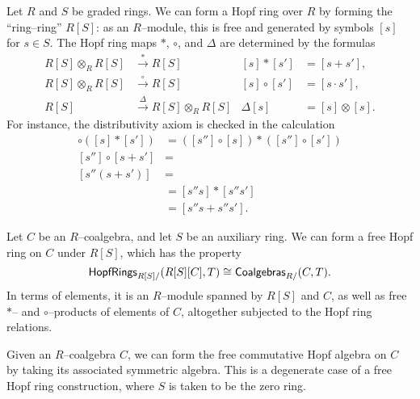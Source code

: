 \begin{definition}
Let $R$ and $S$ be graded rings.  We can form a Hopf ring over $R$ by forming the ``ring--ring'' $R[S]$: as an $R$--module, this is free and generated by symbols $[s]$ for $s \in S$.  The Hopf ring maps $\ast$, $\circ$, and $\Delta$ are determined by the formulas
\begin{align*}
R[S] \otimes_R R[S] & \xrightarrow{\ast} R[S] & [s] \ast [s'] & = [s + s'], \\
R[S] \otimes_R R[S] & \xrightarrow{\circ} R[S] & [s] \circ [s'] & = [s \cdot s'], \\
R[S] & \xrightarrow{\Delta} R[S] \otimes_R R[S] & \Delta [s] & = [s] \otimes [s].
\end{align*}
For instance, the distributivity axiom is checked in the calculation
\begin{align*}
[s''] \circ ([s] \ast [s']) & = ([s''] \circ [s]) \ast ([s''] \circ [s']) \\
[s''] \circ [s + s'] & = \\
[s''(s + s')] & = \\
& = [s'' s] \ast [s'' s'] \\
& = [s'' s + s'' s'].
\end{align*}
\end{definition}

\begin{definition}
Let $C$ be an $R$--coalgebra, and let $S$ be an auxiliary ring.  We can form a free Hopf ring on $C$ under $R[S]$, which has the property \[\mathsf{HopfRings}_{R[S]/}(R[S][C], T) \cong \mathsf{Coalgebras}_{R/}(C, T).\]  In terms of elements, it is an $R$--module spanned by $R[S]$ and $C$, as well as free $\ast$-- and $\circ$--products of elements of $C$, altogether subjected to the Hopf ring relations.
\end{definition}

\begin{remark}
Given an $R$--coalgebra $C$, we can form the free commutative Hopf algebra on $C$ by taking its associated symmetric algebra.  This is a degenerate case of a free Hopf ring construction, where $S$ is taken to be the zero ring.
\end{remark}

